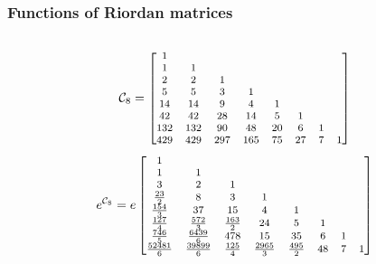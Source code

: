 \documentclass[9pt]{beamer}
\begin{document}
\begin{frame}[fragile]
\frametitle{Functions of Riordan matrices}
\begin{columns}
    \begin{column}{0.6\textwidth}
        \begin{displaymath}
        \footnotesize
        \mathcal{C}_{8}=\left[\begin{matrix}1 &   &   &   &   &   &   &  \\1 & 1 &   &   &   &   &   &  \\2 & 2 & 1 &   &   &   &   &  \\5 & 5 & 3 & 1 &   &   &   &  \\14 & 14 & 9 & 4 & 1 &   &   &  \\42 & 42 & 28 & 14 & 5 & 1 &   &  \\132 & 132 & 90 & 48 & 20 & 6 & 1 &  \\429 & 429 & 297 & 165 & 75 & 27 & 7 & 1\end{matrix}\right]
        \end{displaymath}
        \begin{displaymath}
        \footnotesize
        e^{\mathcal{C}_{8}} = e \left[\begin{matrix}1 &   &   &   &   &   &   &  \\1 & 1 &   &   &   &   &   &  \\3 & 2 & 1 &   &   &   &   &  \\\frac{23}{2} & 8 & 3 & 1 &   &   &   &  \\\frac{154}{3} & 37 & 15 & 4 & 1 &   &   &  \\\frac{1 27}{4} & \frac{572}{3} & \frac{163}{2} & 24 & 5 & 1 &   &  \\\frac{7 46}{5} & \frac{6439}{6} & 478 & 15  & 35 & 6 & 1 &  \\\frac{5 2481}{6 } & \frac{39 899}{6 } & \frac{12  5}{4} & \frac{2965}{3} & \frac{495}{2} & 48 & 7 & 1\end{matrix}\right]

\end{displaymath}
\end{column}
\end{columns}
\end{frame}
\end{document}
